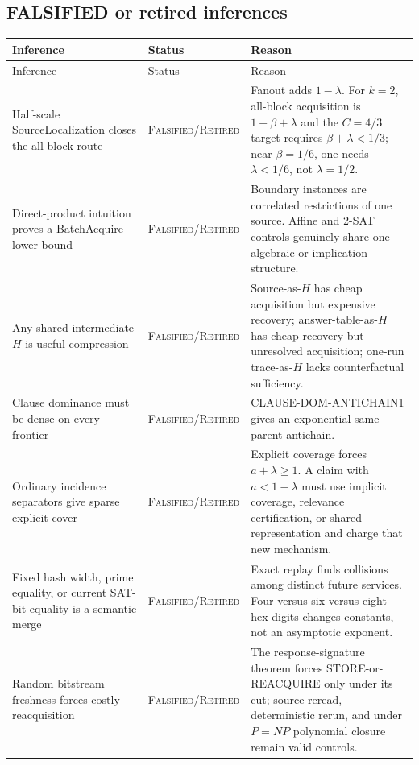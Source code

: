 \documentclass[10pt]{article}
\newcommand{\Falsified}{\textsc{Falsified/Retired}}
\begin{document}
\subsection*{FALSIFIED or retired inferences}
\small
\begin{longtable}{L{0.25\textwidth}L{0.20\textwidth}L{0.48\textwidth}}
\toprule
Inference & Status & Reason \\
\midrule
\endfirsthead
\toprule
Inference & Status & Reason \\
\midrule
\endhead
\bottomrule
\endfoot

Half-scale SourceLocalization closes the all-block route & \Falsified{} &
Fanout adds $1-\lambda$.  For $k=2$, all-block acquisition is
$1+\beta+\lambda$ and the $C=4/3$ target requires
$\beta+\lambda<1/3$; near $\beta=1/6$, one needs $\lambda<1/6$, not
$\lambda=1/2$. \\

Direct-product intuition proves a BatchAcquire lower bound & \Falsified{} &
Boundary instances are correlated restrictions of one source.  Affine and
2-SAT controls genuinely share one algebraic or implication structure. \\

Any shared intermediate $H$ is useful compression & \Falsified{} &
Source-as-$H$ has cheap acquisition but expensive recovery; answer-table-as-$H$
has cheap recovery but unresolved acquisition; one-run trace-as-$H$ lacks
counterfactual sufficiency. \\

Clause dominance must be dense on every frontier & \Falsified{} &
CLAUSE-DOM-ANTICHAIN1 gives an exponential same-parent antichain. \\

Ordinary incidence separators give sparse explicit cover & \Falsified{} &
Explicit coverage forces $a+\lambda\ge1$.  A claim with
$a<1-\lambda$ must use implicit coverage, relevance certification, or shared
representation and charge that new mechanism. \\

Fixed hash width, prime equality, or current SAT-bit equality is a semantic
merge & \Falsified{} & Exact replay finds collisions among distinct future
services.  Four versus six versus eight hex digits changes constants, not an
asymptotic exponent. \\

Random bitstream freshness forces costly reacquisition & \Falsified{} &
The response-signature theorem forces STORE-or-REACQUIRE only under its cut;
source reread, deterministic rerun, and under $P=NP$ polynomial closure remain
valid controls. \\


\end{longtable}
\end{document}
